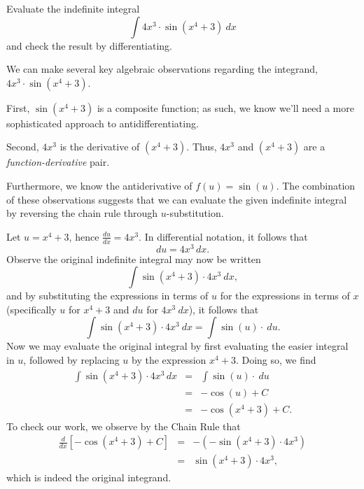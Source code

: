\begin{example} \label{Ex:4.6.usub1} %
Evaluate the indefinite integral
\[ \int 4x^3 \cdot \sin (x^4 + 3) \ dx \]
and check the result by differentiating.

\solution
We can make several key algebraic observations regarding the integrand, $4x^3 \cdot \sin (x^4 + 3)$.  

First, $\sin (x^4 + 3)$ is a composite function; as such, we know we'll need a more sophisticated approach to antidifferentiating.  

Second, $4x^3$ is the derivative of $(x^4 + 3)$.  Thus, $4x^3$ and $(x^4 + 3)$ are a \emph{function-derivative} pair. 

Furthermore, we know the antiderivative of $f(u) = \sin(u)$.  The combination of these observations suggests that we can evaluate the given indefinite integral by reversing the chain rule through $u$-substitution.

Let $u = x^4 + 3$, hence $\frac{du}{dx} = 4x^3.$  In differential notation, it follows that 
\[ du = 4x^3 \, dx. \]
Observe the original indefinite integral may now be written 
\[ \int \sin (x^4 + 3) \cdot 4x^3 \ dx, \]
and by substituting the expressions in terms of $u$ for the expressions in terms of $x$ (specifically $u$ for $x^4 + 3$ and $du$ for $4x^3 \ dx$), it follows that
\[ \int \sin (x^4 + 3) \cdot 4x^3 \ dx = \int \sin(u) \cdot \ du. \]
Now we may evaluate the original integral by first evaluating the easier integral in $u$, followed by replacing $u$ by the expression $x^4 + 3$.  Doing so, we find
\begin{eqnarray*}
\int \sin (x^4 + 3) \cdot 4x^3 \, dx & = & \int \sin(u) \cdot \ du \\
& = & -\cos(u) + C \\
& = & -\cos(x^4 + 3) + C.
\end{eqnarray*}
To check our work, we observe by the Chain Rule that
\begin{eqnarray*}
\frac{d}{dx} \left[ -\cos(x^4 + 3) + C \right]  & = & -( -\sin(x^4 + 3) \cdot 4x^3) \\
& = & \sin(x^4 + 3) \cdot 4x^3,
\end{eqnarray*}
which is indeed the original integrand.
\end{example}